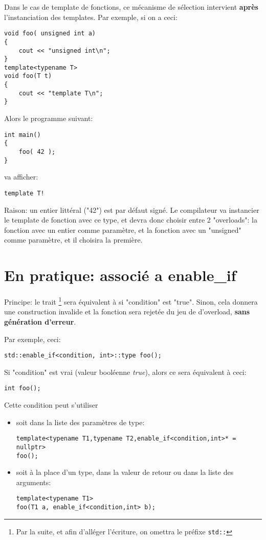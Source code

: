 \documentclass[11pt,a4paper]{article}
\begin{document}
Dans le cas de template de fonctions, ce mécanisme de sélection intervient {\bf après} l'instanciation des templates.
Par exemple, si on a ceci:
\begin{lstlisting}
void foo( unsigned int a)
{
	cout << "unsigned int\n";
}
template<typename T>
void foo(T t)
{
	cout << "template T\n";
}
\end{lstlisting}

Alors le programme suivant:
\begin{lstlisting}
int main()
{
	foo( 42 );
}
\end{lstlisting}

va afficher:
\begin{lstlisting}
template T!
\end{lstlisting}

Raison: un entier littéral ("42") est par défaut signé.
Le compilateur va instancier le template de fonction avec ce type, et devra donc choisir entre 2 "overloads":
la fonction avec un entier comme paramètre, et la fonction avec un "unsigned" comme paramètre, et il choisira la première.


\section{En pratique: associé a enable\_if}

Principe:
le trait %
\footnote{Par la suite, et afin d'alléger l'écriture, on omettra le préfixe {\tt std::}}
sera équivalent à  si "condition" est "true".
Sinon, cela donnera une construction invalide et la fonction sera rejetée du jeu de d'overload, {\bf sans génération d'erreur}.

Par exemple, ceci:
\begin{lstlisting}
std::enable_if<condition, int>::type foo();
\end{lstlisting}
Si "condition" est vrai (valeur booléenne {\em true}), alors ce sera équivalent à ceci:
\begin{lstlisting}
int foo();
\end{lstlisting}

Cette condition peut s'utiliser
\begin{itemize}
	\item soit dans la liste des paramètres de type:
\begin{lstlisting}
template<typename T1,typename T2,enable_if<condition,int>* = nullptr>
foo();
\end{lstlisting}

	\item soit à la place d'un type, dans la valeur de retour ou dans la liste des arguments:
\begin{lstlisting}
template<typename T1>
foo(T1 a, enable_if<condition,int> b);
\end{lstlisting}
	
\end{itemize}
\end{document}
